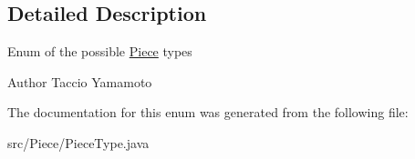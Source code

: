\subsection{Detailed Description}
Enum of the possible \hyperlink{classPiece_1_1Piece}{Piece} types \begin{DoxyAuthor}{Author}
Taccio Yamamoto 
\end{DoxyAuthor}


The documentation for this enum was generated from the following file\-:\begin{DoxyCompactItemize}
\item 
src/\-Piece/Piece\-Type.\-java\end{DoxyCompactItemize}
